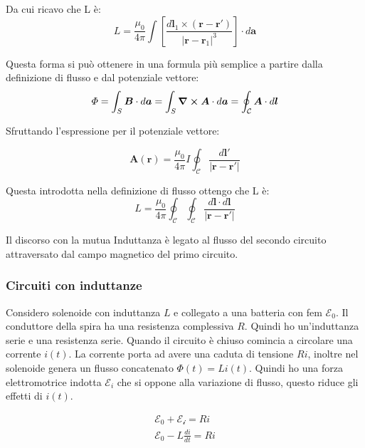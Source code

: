 \documentclass[a4paper]{scrarticle}
\begin{document}
Da cui ricavo che L è:
\begin{equation}
    L = \frac{\mu_0}{4\pi} \int \left[\frac{d \bm l_1 \times (\bm r - \bm r')}{|\bm r - \bm r_1|^3}\right] \cdot d\bm a
\end{equation}

Questa forma si può ottenere in una formula più semplice a partire dalla definizione di flusso e dal potenziale vettore:
\begin{equation*}
    \varPhi = \int_S \bm B \cdot d \bm a = \int_S \curl \bm A \cdot d \bm a = \oint_{\mathcal{C}} \bm A \cdot d \bm l
\end{equation*}

Sfruttando l'espressione per il potenziale vettore:

\begin{equation}
    \bm A (\bm r) = \frac{\mu_0}{4\pi} I \oint_{\mathcal{C}} \frac{d \bm l'}{|\bm r - \bm r'|}
\end{equation}

Questa introdotta nella definizione di flusso ottengo che L è:
\begin{equation}
    L = \frac{\mu_0}{4\pi} \oint_{\mathcal{C}}\oint_{\mathcal{C}} \frac{d\bm l\cdot d\bm l}{|\bm r - \bm r'|}
\end{equation}

Il discorso con la mutua Induttanza è legato al flusso del secondo circuito attraversato dal campo magnetico del primo circuito.

\subsubsection*{Circuiti con induttanze}

Considero solenoide con induttanza $L$ e collegato a una batteria con fem $\mathcal E_0$. Il conduttore della spira ha una resistenza complessiva $R$. Quindi ho un'induttanza serie e una resistenza serie. Quando il circuito è chiuso comincia a circolare una corrente $i(t)$. La corrente porta ad avere una caduta di tensione $Ri$, inoltre nel solenoide genera un flusso concatenato $\varPhi(t) = Li(t)$. Quindi ho una forza elettromotrice indotta $\mathcal E_i$ che si oppone alla variazione di flusso, questo riduce gli effetti di $i(t)$.

\begin{gather*}
    \mathcal{E_0} + \mathcal{E_i} = Ri\\
    \mathcal{E_0} - L \frac{di}{dt} = Ri
\end{gather*}
\end{document}
